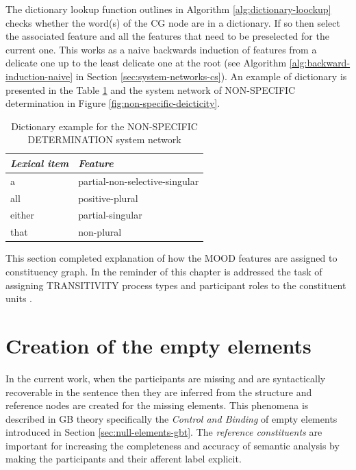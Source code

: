The dictionary lookup function outlines in Algorithm \ref{alg:dictionary-loockup} checks whether the word(s) of the CG node are in a dictionary. If so then select the associated feature and all the features that need to be preselected for the current one. This works as a naive backwards induction of features from a delicate one up to the least delicate one at the root (see Algorithm \ref{alg:backward-induction-naive} in Section \ref{sec:system-networks-cs}). An example of dictionary is presented in the Table \ref{tab:lookup-dict-example} and the system network of NON-SPECIFIC determination in Figure \ref{fig:non-specific-deicticity}.

\begin{table}[!ht]
    \centering
    \begin{tabular}{|l|l|}
        \hline
        \textit{Lexical item} & \textit{Feature}               \\ \hline
        a                     & partial-non-selective-singular \\ \hline
        all                   & positive-plural                \\ \hline
        either                & partial-singular               \\ \hline
        that                  & non-plural                     \\ \hline
    \end{tabular}
    \caption{Dictionary example for the NON-SPECIFIC DETERMINATION system network}
    \label{tab:lookup-dict-example}
\end{table}

This section completed explanation of how the MOOD features are assigned to constituency graph. In the reminder of this chapter is addressed the task of assigning TRANSITIVITY process types and participant roles to the constituent units \citep{Costetchi2013}.  

\section{Creation of the empty elements}
\label{sec:creation-empty-elements}

In the current work, when the participants are missing and are syntactically recoverable in the sentence then they are inferred from the structure and reference nodes are created for the missing elements. This phenomena is described in GB theory specifically the \textit{Control and Binding} of empty elements \citep{Haegeman1991} introduced in Section \ref{sec:null-elements-gbt}. The \textit{reference constituents} are important for increasing the completeness and accuracy of semantic analysis by making the participants and their afferent label explicit.

